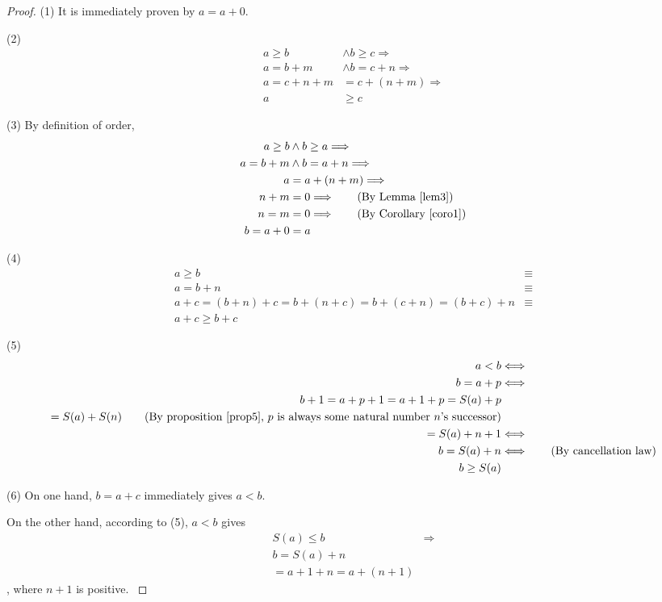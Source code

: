 \begin{proof}
(1) It is immediately proven by $a=a+0$.

(2) 
\begin{align*}
a \geq b &\wedge b \geq c \Longrightarrow \\
a = b+m &\wedge b = c+n \Longrightarrow \\
a = c+n+m &= c+(n+m) \Longrightarrow \\
a &\geq c 
\end{align*}

(3)
By definition of order, 
\begin{align*}
a \geq b &\wedge b \geq a \Longrightarrow \\
a = b+m &\wedge b = a+n \Longrightarrow \\
a &= a+(n+m) \Longrightarrow \\
n+m&=0 \Longrightarrow \tag{By Lemma \ref{lem3}}\\
n=m&=0 \Longrightarrow \tag{By Corollary \ref{coro1}} \\
b=a+0&=a
\end{align*}

(4)
\begin{align*}
a \geq b &\equiv \\
a = b+n &\equiv \\
a+c=(b+n)+c=b+(n+c)=b+(c+n)=(b+c)+n &\equiv \\
a+c \geq b+c
\end{align*}

(5)
\begin{align*}
a<b &\Longleftrightarrow \\
b=a+p &\Longleftrightarrow \\
b+1=a+p+1=a+1+p=S(a)+p \\
=S(a)+S(n) \tag{By proposition \ref{prop5}, $p$ is always some natural number $n$'s successor}\\
=S(a)+n+1 &\Longleftrightarrow \\
b=S(a)+n &\Longleftrightarrow \tag{By cancellation law} \\
b \geq S(a)
\end{align*} \label{prop.5}

(6)
On one hand, $b=a+c$ immediately gives $a<b$.

On the other hand, according to (5), $a<b$ gives 
\begin{align*}
S(a) \leq b  &\Longrightarrow\\
b = S(a) + n& \\
= a+1+n = a+(n+1)&
\end{align*}, where $n+1$ is positive. \label{prop.6}
\end{proof}

